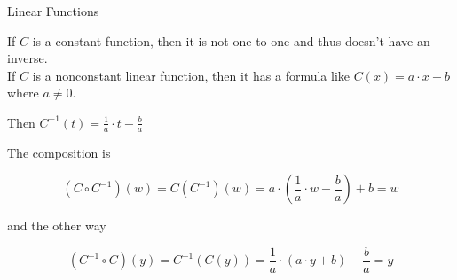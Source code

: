 \documentclass{ximera}
\begin{document}
\begin{example} Linear Functions

If $C$ is a constant function, then it is not one-to-one and thus doesn't have an inverse. \\


If $C$ is a nonconstant linear function, then it has a formula like $C(x) = a \cdot x + b$ where $a \ne 0$.


Then $C^{-1}(t) = \frac{1}{a} \cdot t - \frac{b}{a}$


\begin{explanation}



The composition is 

\[  (C \circ C^{-1})(w) = C(C^{-1})(w) =     a \cdot \left(\frac{1}{a} \cdot w - \frac{b}{a}\right) + b  = w \]


and the other way


\[  (C^{-1} \circ C)(y) = C^{-1}(C(y)) =     \frac{1}{a} \cdot (a \cdot y + b) - \frac{b}{a}  = y \]


\end{explanation}


\end{example}
\end{document}
